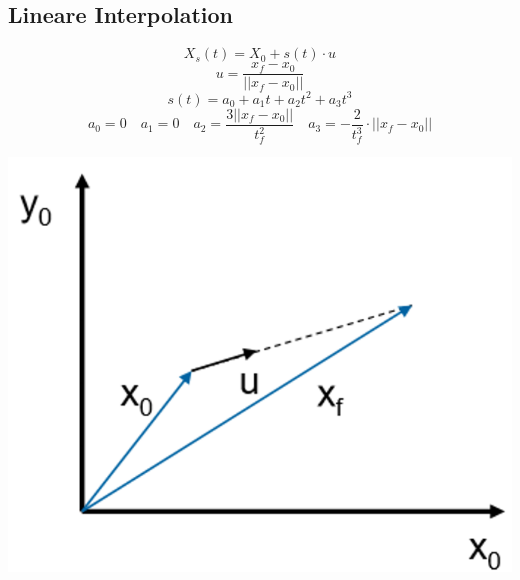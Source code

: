 \begin{minipage}{0.7\linewidth}
    \subsection{Lineare Interpolation}
    \vspace{-0.8cm}
    \[ X_s(t) = X_0 + s(t) \cdot u \]
    \[ u= \frac{x_f - x_0}{||x_f -x_0||} \]
    \[ s(t)=a_0 + a_1 t + a_2 t^2 +a_3t^3 \]
    \[ a_0=0 \quad a_1=0 \quad a_2=\frac{3||x_f-x_0||}{t_f^2} \quad a_3=-\frac{2}{t_f^3}\cdot ||x_f-x_0||  \]
\end{minipage}
\begin{minipage}{0.3\linewidth}
    \includegraphics[width=0.9\linewidth]{./bilder/LinInter}
\end{minipage}

\clearpage

